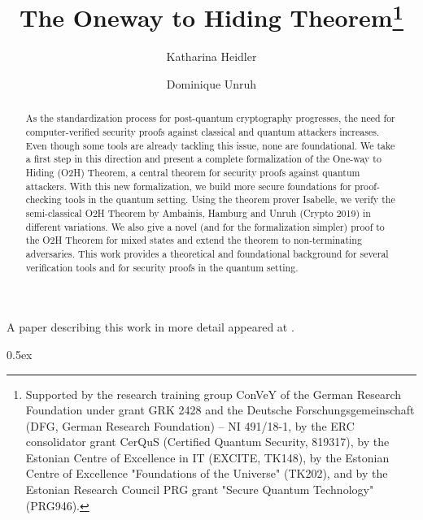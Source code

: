 \documentclass[11pt,a4paper]{article}
\begin{document}
\title{The Oneway to Hiding Theorem\thanks{Supported by the research training group ConVeY of the German Research Foundation under grant GRK 2428 and the Deutsche Forschungsgemeinschaft (DFG, German Research Foundation) -- NI 491/18-1, by the ERC consolidator grant CerQuS (Certified Quantum Security,  819317), by
the Estonian Centre of Excellence in IT (EXCITE, TK148), by
the Estonian Centre of Excellence "Foundations of the Universe" (TK202), and by
the Estonian Research Council PRG grant "Secure Quantum Technology" (PRG946).}}

\author{Katharina Heidler\and Dominique Unruh}
\maketitle

\begin{abstract}
As the standardization process for post-quantum cryptography progresses, the need for computer-verified security proofs against classical and quantum attackers increases. 
Even though some tools are already tackling this issue, none are foundational. 
We take a first step in this direction and present a complete formalization of the One-way to Hiding (O2H) Theorem, a central theorem for security proofs against quantum attackers. 
With this new formalization, we build more secure foundations for proof-checking tools in the quantum setting.
Using the theorem prover Isabelle, we verify the semi-classical O2H Theorem by Ambainis, Hamburg and Unruh (Crypto 2019) in different variations. We also give a novel (and for the formalization simpler) proof to the O2H Theorem for mixed states and extend the theorem to non-terminating adversaries.
This work provides a theoretical and foundational background for several verification tools and for security proofs in the quantum setting.
\end{abstract}

A paper describing this work in more detail appeared at \cite{HeidlerU25}.

\nocite{Ambainis19}

\tableofcontents

\parindent 0pt\parskip 0.5ex





\end{document}
